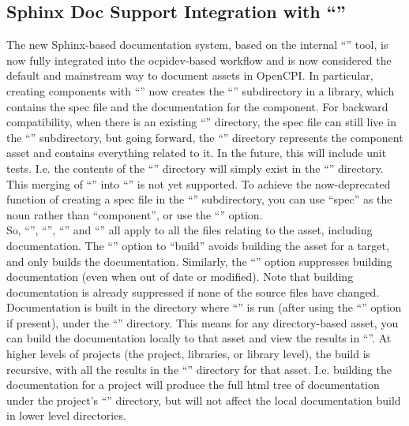 \subsection{Sphinx Doc Support Integration with ``''}
\label{sec:25_sphinx}
The new Sphinx-based documentation system, based on the internal ``'' tool, is now fully integrated into the ocpidev-based workflow and is now considered the default and mainstream way to document assets in OpenCPI.  In particular, creating components with ``'' now creates the ``'' subdirectory in a library, which contains the spec file and the documentation for the component.  For backward compatibility, when there is an existing ``'' directory, the spec file can still live in the ``'' subdirectory, but going forward, the ``'' directory represents the
component asset and contains everything related to it.  In the future, this will include unit tests.  I.e. the contents of the ``'' directory will simply exist in the ``'' directory.  This merging of ``'' into ``'' is not yet supported.  To achieve the now-deprecated function of creating a spec file in the ``'' subdirectory, you can use ``spec'' as the noun rather than ``component'', or use the ``'' option.\\

So, ``'', ``'', ``'' and ``'' all apply to all the files relating to the asset, including documentation.  The ``'' option to ``build'' avoids building the asset for a target, and only builds the documentation.  Similarly, the ``'' option suppresses building documentation (even when out of date or modified).  Note that building documentation is already suppressed if none of the source files have changed.\\

Documentation is built in the directory where ``'' is run (after using the ``'' option if present), under the ``'' directory.  This means for any directory-based asset, you can build the documentation locally to that asset and view the results in ``''.  At higher levels of projects (the project, libraries, or library level), the build is recursive, with all the results in the ``'' directory for that asset.  I.e. building the documentation for a project will produce the full html tree of documentation under the project's ``'' directory, but will not affect the local documentation build in lower level directories.\\

